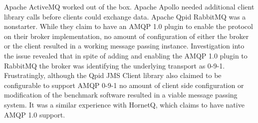 \documentclass{thesis}
\begin{document}
Apache ActiveMQ worked out of the box.  
Apache Apollo needed additional client library calls before clients could exchange data.
Apache Qpid 
RabbitMQ was a nonstarter.  While they claim to have an AMQP 1.0 plugin to enable the protocol on their broker implementation, no amount of configuration of either the broker or the client resulted in a working message passing instance.  Investigation into the issue revealed that in spite of adding and enabling the AMQP 1.0 plugin to RabbitMQ the broker was identifying the underlying transport as 0-9-1.  Frustratingly, although the Qpid JMS Client library also claimed to be configurable to support AMQP 0-9-1 no amount of client side configuration or modification of the benchmark software resulted in a viable message passing system.
It was a similar experience with HornetQ, which claims to have native AMQP 1.0 support. 

%
\end{document}
